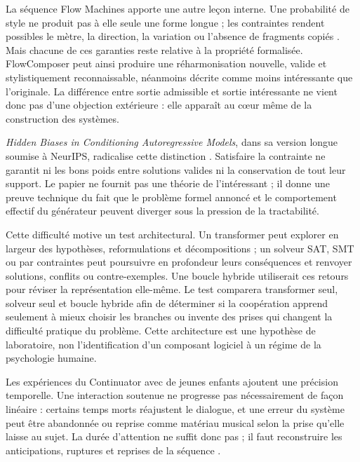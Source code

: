 \documentclass[11pt,a4paper]{article}
\begin{document}
La séquence Flow Machines apporte une autre leçon interne. Une probabilité de style
ne produit pas à elle seule une forme longue ; les contraintes rendent possibles le
mètre, la direction, la variation ou l'absence de fragments copiés
\parencite{pachet2011markov,barbieri2012lyrics,papadopoulos2014avoiding,
papadopoulos2016nonplagiaristic,papadopoulos2016flowcomposer,
pachet2017variations}. Mais chacune de ces garanties reste relative à la propriété
formalisée. FlowComposer peut ainsi produire une réharmonisation nouvelle, valide et
stylistiquement reconnaissable, néanmoins décrite comme moins intéressante que
l'originale. La différence entre sortie admissible et sortie intéressante ne vient
donc pas d'une objection extérieure : elle apparaît au cœur même de la construction
des systèmes.

\emph{Hidden Biases in Conditioning Autoregressive Models}, dans sa version
longue soumise à NeurIPS, radicalise cette distinction
\parencite{pachet2026biases}. Satisfaire la contrainte ne garantit ni les bons
poids entre solutions valides ni la conservation de tout leur support. Le papier
ne fournit pas une théorie de l'intéressant ; il donne une preuve technique du
fait que le problème formel annoncé et le comportement effectif du générateur
peuvent diverger sous la pression de la tractabilité.

Cette difficulté motive un test architectural. Un transformer peut explorer en
largeur des hypothèses, reformulations et décompositions ; un solveur SAT, SMT ou
par contraintes peut poursuivre en profondeur leurs conséquences et renvoyer
solutions, conflits ou contre-exemples. Une boucle hybride utiliserait ces
retours pour réviser la représentation elle-même. Le test comparera transformer
seul, solveur seul et boucle hybride afin de déterminer si la coopération apprend
seulement à mieux choisir les branches ou invente des prises qui changent la
difficulté pratique du problème. Cette architecture est une hypothèse de
laboratoire, non l'identification d'un composant logiciel à un régime de la
psychologie humaine.

Les expériences du Continuator avec de jeunes enfants ajoutent une précision
temporelle. Une interaction soutenue ne progresse pas nécessairement de façon
linéaire : certains temps morts réajustent le dialogue, et une erreur du système
peut être abandonnée ou reprise comme matériau musical selon la prise qu'elle
laisse au sujet. La durée d'attention ne suffit donc pas ; il faut reconstruire
les anticipations, ruptures et reprises de la séquence
\parencite{addessi2005experiments,addessi2006flowmachine}.
\end{document}
